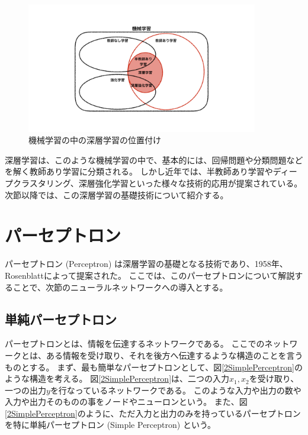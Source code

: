 \begin{figure}[h]
 \centering
 \includegraphics[width=0.9\textwidth]{Figure/2DeepLearning/1MachineLearning.png}
 \caption{機械学習の中の深層学習の位置付け}
 \label{1MachineLearning}
\end{figure}

深層学習は、このような機械学習の中で、基本的には、回帰問題や分類問題などを解く教師あり学習に分類される。
しかし近年では、半教師あり学習やディープクラスタリング、深層強化学習といった様々な技術的応用が提案されている。
次節以降では、この深層学習の基礎技術について紹介する。


\section{パーセプトロン} \label{DL:Perceptron}

パーセプトロン (Perceptron) は深層学習の基礎となる技術であり、1958年、Rosenblattによって提案された\cite{PerceptronPaper}。
ここでは、このパーセプトロンについて解説することで、次節のニューラルネットワークへの導入とする。


\subsection{単純パーセプトロン} \label{DL:Percep:SimplePerceptron}

パーセプトロンとは、情報を伝達するネットワークである。
ここでのネットワークとは、ある情報を受け取り、それを後方へ伝達するような構造のことを言うものとする。
まず、最も簡単なパーセプトロンとして、図\ref{2SimplePerceptron}のような構造を考える。
図\ref{2SimplePerceptron}は、二つの入力$x_1,x_2$を受け取り、一つの出力$y$を行なっているネットワークである。
このような入力や出力の数や入力や出力そのものの事をノードやニューロンという。
また、図\ref{2SimplePerceptron}のように、ただ入力と出力のみを持っているパーセプトロンを特に単純パーセプトロン (Simple Perceptron) という。

